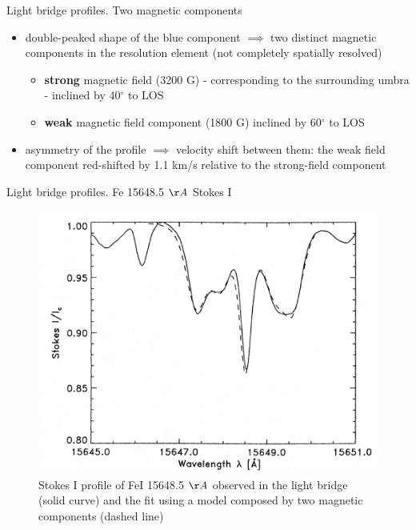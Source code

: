 \documentclass{beamer}
\begin{document}
\begin{frame}{Light bridge profiles. Two magnetic components}
\begin{itemize}
\item double-peaked shape of the blue component $\implies$ two distinct magnetic components 
in the resolution element (not completely spatially resolved)
\begin{itemize}
\item {\bf strong} magnetic field (3200 G) - corresponding to the surrounding umbra - inclined by 40$^{\circ}$ to LOS
\item{\bf weak} magnetic field component (1800 G) inclined by 60$^{\circ}$ to LOS
\end{itemize}
\item asymmetry of the profile $\implies$ velocity shift between them:
the weak field component red-shifted by 1.1 km/s relative to the strong-field component
\end{itemize}

\end{frame}

\begin{frame}{Light bridge profiles. Fe 15648.5 $\AA$ Stokes I}

\begin{figure}[H]
 \centering
 \includegraphics[scale=0.4]{stokesI.png}
\caption{Stokes I profile of FeI 15648.5 $\AA$ observed in the light bridge (solid curve) and the fit using
a model composed by two magnetic components (dashed line)}
\end{figure}
\end{frame}
\end{document}
